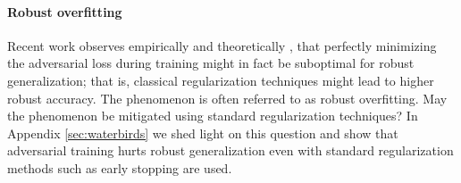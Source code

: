 

  


\paragraph{Robust overfitting}
Recent work observes empirically \cite{rice20} and theoretically
\cite{sanyal20, donhauser21}, that perfectly minimizing the
adversarial loss during training might in fact be suboptimal for
robust generalization; that is, classical regularization techniques
might lead to higher robust accuracy. The phenomenon is often referred
to as robust overfitting. May the phenomenon be mitigated using
standard regularization techniques?  In Appendix \ref{sec:waterbirds} we shed light on
this question and show that adversarial training hurts robust generalization even with standard regularization methods such as early stopping are used.

